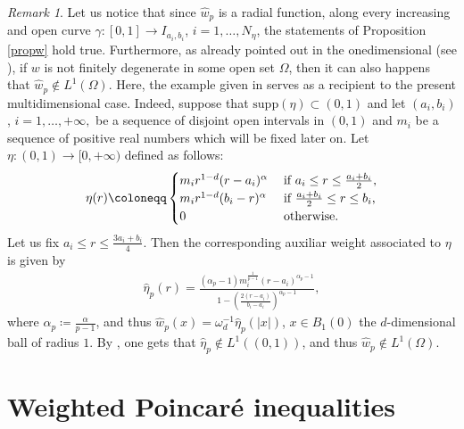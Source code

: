 \documentclass[11pt,leqno]{amsart}
\theoremstyle{remark}
\newtheorem{oss}[teo]{Remark}
\theoremstyle{definition}
\theoremstyle{definition}
\newcommand{\wstar}{{\hat w}}
\newcommand{\supp}{\mathrm{supp}}
\begin{document}
\begin{oss}
Let us notice that since $\wstar_{p}$ is a radial function, along every increasing and  open curve $\gamma: [0,1]\rightarrow I_{a_{i},b_{i}}$, $i=1,\ldots, N_{\eta}$, the statements of Proposition \autoref{propw} hold true.  Furthermore, as already pointed out in the onedimensional (see \cite[Remark 2.6]{CCMH1}), if $w$ is not finitely degenerate in some open set $\Omega$, then it can also happens that $\wstar_{p}\notin L^{1}(\Omega)$. Here, the example given in \cite[Remark 2.6]{CCMH1} serves as a recipient to the present multidimensional case. Indeed, suppose that $\supp(\eta)\subset (0,1)$ and let $(a_{i},b_{i})$, $i=1,\ldots, +\infty,$ be a sequence of disjoint open intervals in $(0,1)$ and $m_{i}$ be a sequence of positive real numbers which will be fixed later on. Let $\eta:(0,1)\rightarrow [0,+\infty)$ defined as follows:
\begin{align*}
\eta(r)\coloneqq
\begin{cases}
m_{i}r^{1-d}(r-a_{i})^{\alpha}& \hskip 0,1cm \text{if $a_{i}\leq r\leq \frac{a_{i}+b_{i}}{2}$,}\\
m_{i}r^{1-d}(b_{i}-r)^{\alpha}& \hskip 0,1cm \text{if $\frac{a_{i}+b_{i}}{2}\leq r\leq b_{i}$,}\\
0&\hskip 0,1cm \text{otherwise}.
\end{cases}
\end{align*}
Let us fix $a_{i}\leq r\leq \frac{3a_{i}+b_{i}}{4}$. Then the corresponding auxiliar weight associated to $\eta$ is given by 
\begin{align*}
\hat{\eta}_{p}(r)=\frac{(\alpha_{p}-1)m_{i}^{\frac{1}{p-1}}(r-a_{i})^{\alpha_{p}-1}}{1-\left(\frac{2(r-a_{i})}{b_{i}-a_{i}}\right)^{\alpha_{p}-1}},
\end{align*}
where $\alpha_{p}\coloneqq \frac{\alpha}{p-1}$, and thus $\wstar_{p}(x)=\omega_{d}^{-1}\hat{\eta}_{p}(\vert x\vert)$, $x\in B_{1}(0)$ the $d$-dimensional ball of radius $1$. By \cite[Remark 2.6]{CCMH1}, one gets that $\hat{\eta}_{p}\notin L^{1}((0,1))$, and thus $\wstar_{p}\notin L^{1}(\Omega)$.
\end{oss}
\section{Weighted Poincar\'e inequalities}\label{sec:3}
\end{document}
